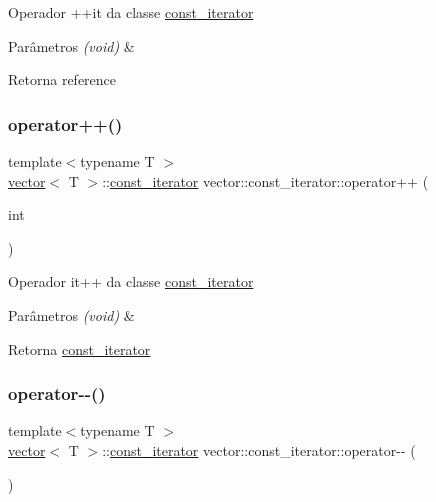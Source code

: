 Operador ++it da classe \mbox{\hyperlink{classsc_1_1vector_1_1const__iterator}{const\+\_\+iterator}} 
\begin{DoxyParams}{Parâmetros}
{\em (void)} & \\
\hline
\end{DoxyParams}
\begin{DoxyReturn}{Retorna}
reference 
\end{DoxyReturn}
\mbox{\label{classsc_1_1vector_1_1const__iterator_a68877e764d63f2544e264cd8eecb77ba}} 
\subsubsection{\texorpdfstring{operator++()}{operator++()}\hspace{0.1cm}{\footnotesize\ttfamily [2/2]}}
{\footnotesize\ttfamily template$<$typename T $>$ \\
\mbox{\hyperlink{classsc_1_1vector}{vector}}$<$ T $>$\+::\mbox{\hyperlink{classsc_1_1vector_1_1const__iterator}{const\+\_\+iterator}} vector\+::const\+\_\+iterator\+::operator++ (\begin{DoxyParamCaption}\item[{int}]{ }\end{DoxyParamCaption})}

Operador it++ da classe \mbox{\hyperlink{classsc_1_1vector_1_1const__iterator}{const\+\_\+iterator}} 
\begin{DoxyParams}{Parâmetros}
{\em (void)} & \\
\hline
\end{DoxyParams}
\begin{DoxyReturn}{Retorna}
\mbox{\hyperlink{classsc_1_1vector_1_1const__iterator}{const\+\_\+iterator}} 
\end{DoxyReturn}
\mbox{\label{classsc_1_1vector_1_1const__iterator_ad6ee45c30ea01cceb40c2494aea02d0f}} 
\subsubsection{\texorpdfstring{operator-\/-\/()}{operator--()}\hspace{0.1cm}{\footnotesize\ttfamily [1/2]}}
{\footnotesize\ttfamily template$<$typename T $>$ \\
\mbox{\hyperlink{classsc_1_1vector}{vector}}$<$ T $>$\+::\mbox{\hyperlink{classsc_1_1vector_1_1const__iterator}{const\+\_\+iterator}} vector\+::const\+\_\+iterator\+::operator-\/-\/ (\begin{DoxyParamCaption}{ }\end{DoxyParamCaption})}

